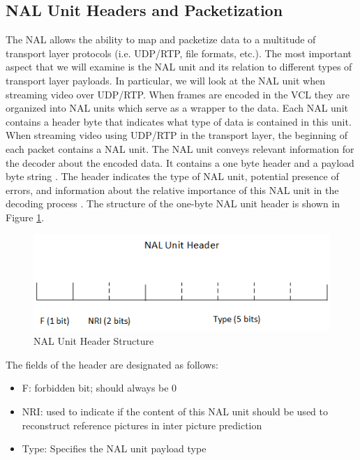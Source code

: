 \documentclass[preprint, 12pt]{elsarticle}
\begin{document}
\subsection{NAL Unit Headers and Packetization}
\label{sec:NALandPacketization}

The NAL allows the ability to map and packetize data to a multitude of transport layer protocols (i.e. UDP/RTP, file formats, etc.). The most important aspect that we will examine is the NAL unit and its relation to different types of transport layer payloads. In particular, we will look at the NAL unit when streaming video over UDP/RTP. When frames are encoded in the VCL they are organized into NAL units which serve as a wrapper to the data. Each NAL unit contains a header byte that indicates what type of data is contained in this unit. When streaming video using UDP/RTP in the transport layer, the beginning of each packet contains a NAL unit. The NAL unit conveys relevant information for the decoder about the encoded data. It contains a one byte header and a payload byte string \cite{RTP}. The header indicates the type of NAL unit, potential presence of errors, and information about the relative importance of this NAL unit in the decoding process \cite{RTP}. The structure of the one-byte NAL unit header is shown in Figure \ref{fig:NALHeaderStructure}.
\begin{figure}[h]
\centering
\includegraphics[width=0.7\linewidth]{NALUnitHeader.png}
\caption{NAL Unit Header Structure}
\label{fig:NALHeaderStructure}
\end{figure}
The fields of the header are designated as follows:
\begin{itemize}
\item F: forbidden bit; should always be 0
\item NRI: used to indicate if the content of this NAL unit should be used to reconstruct reference pictures in inter picture prediction
\item Type: Specifies the NAL unit payload type
\end{itemize}
\end{document}
